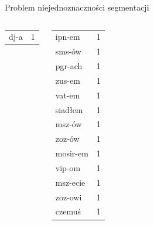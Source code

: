 \documentclass{beamer}
\begin{document}
\begin{frame}{Problem niejednoznaczności segmentacji}
\begin{columns}[c]
\begin{center}
\begin{tabular}{l|r}
        dj-a & 1 \\
      \end{tabular}
    \end{center}
    \begin{center}
      \footnotesize
      \begin{tabular}{l|r}
        ipn-em & 1 \\
        sms-ów & 1 \\
        pgr-ach & 1 \\
        zus-em & 1 \\
        vat-em & 1 \\
        siadłem & 1 \\
        msz-ów & 1 \\
        zoz-ów & 1 \\
        mosir-em & 1 \\
        vip-om & 1 \\
        msz-ecie & 1 \\
        zoz-owi & 1 \\
        czemuś & 1 \\
      \end{tabular}
    \end{center}
  \end{columns}
\end{frame}
\end{document}
